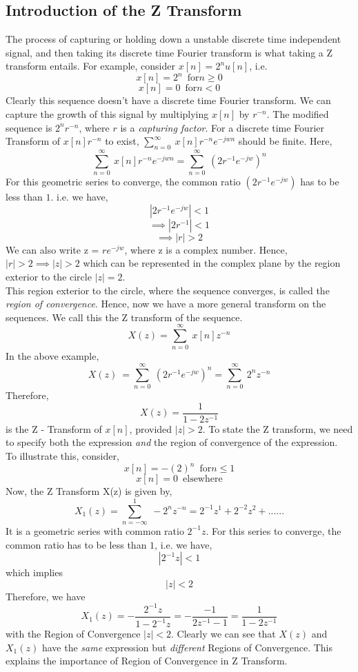 \subsection{Introduction of the Z Transform}
The process of capturing or holding down a unstable discrete time independent signal, and then taking its discrete time Fourier transform is what taking a Z transform entails.
For example, consider $x[n] = 2^n u[n]$, i.e.
\[ x[n] = 2^n	\enspace	\text{for}	 n \geq 0 \]
\[ x[n] = 0	\enspace  \text{for} n<0 \]  
Clearly this sequence doesn't have a discrete time Fourier transform. We can capture the growth of this signal by multiplying $x[n]$ by $r^{-n}$. The modified sequence is $2^{n}r^{-n}$, where $r$ is a \textit{capturing factor}. For a discrete time Fourier Transform of $x[n]r^{-n}$ to exist, $\sum_{n=0}^{\infty}\ x[n]r^{-n}e^{-jwn}$ should be finite.
Here,
\[ \sum_{n=0}^{\infty}\ x[n]r^{-n}e^{-jwn} = \sum_{n=0}^{\infty}\ ({2r^{-1}e^{-jw}})^{n} \]
For this geometric series to converge, the common ratio $(2r^{-1}e^{-jw})$ has to be less than $1$. i.e. we have,
\[ |2r^{-1}e^{-jw}| < 1 \]
\[ \implies |2r^{-1}| < 1 \]
\[ \implies |r| > 2 \]
We can also write z = $re^{-jw}$, where z is a complex number. Hence, $|r|>2 \implies |z|>2$ which can be represented in the complex plane by the region exterior to the circle $|z|=2$.\\
This region exterior to the circle, where the sequence converges, is called the \emph{region of convergence}. Hence, now we have a more general transform on the sequences. We call this the Z transform of the sequence.
\[  X(z) = \sum_{n=0}^{\infty}\ x[n]z^{-n} \]
In the above example,
\[  X(z)\ = \sum_{n=0}^{\infty}\ ({2r^{-1}e^{-jw}})^{n} = \sum_{n=0}^{\infty}\ 2^{n}z^{-n} \]
Therefore,
\[ X(z) = \frac{1}{1-2z^{-1}} \] is the Z - Transform of $x[n]$, provided $|z|>2$.
To state the Z transform, we need to specify both the expression \emph{and} the region of convergence of the expression.\\
To illustrate this, consider, 
\[ x[n] = -(2)^n	\enspace	\text{for} n \leq 1 \]
\[ x[n] = 0 \enspace \text{elsewhere} \]
Now, the Z Transform X(z) is given by,
\[ X_1(z) = \sum_{n=-\infty}^{1}\ -2^{n}z^{-n} = 2^{-1}z^{1} + 2^{-2}z^{2} + ...... \]
It is a geometric series with common ratio $2^{-1}z$. For this series to converge, the common ratio has to be less than $1$, i.e. we have,
\[ |2^{-1}z| < 1 \]
which implies
\[ |z| < 2 \]
Therefore, we have 
\[ X_1(z) = -\frac{2^{-1}z}{1-2^{-1}{z}} = -\frac{-1}{2z^{-1}-1} = \frac{1}{1-2z^{-1}} \]
with the Region of Convergence $|z|<2$.
Clearly we can see that $X(z)$ and $X_1(z)$ have the \emph{same} expression but \emph{different} Regions of Convergence. This explains the importance of Region of Convergence in Z Transform.







                



                     
